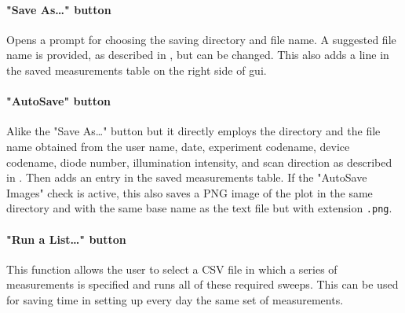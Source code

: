 		\paragraph{"Save As\dots" button}
		Opens a prompt for choosing the saving directory and file name.
		A suggested file name is provided, as described in , but can be changed.
		This also adds a line in the saved measurements table on the right side of \gls{gui}.

		\paragraph{"AutoSave" button}
		Alike the "Save As\dots" button but it directly employs the directory and the file name obtained from the user name, date, experiment codename, device codename, diode number, illumination intensity, and scan direction as described in .
		Then adds an entry in the saved measurements table.
		If the "AutoSave Images" check is active, this also saves a PNG image of the plot in the same directory and with the same base name as the text file but with extension \texttt{.png}.

		\paragraph{"Run a List\dots" button}
		This function allows the user to select a CSV file in which a series of measurements is specified and runs all of these required sweeps.
		This can be used for saving time in setting up every day the same set of measurements.

